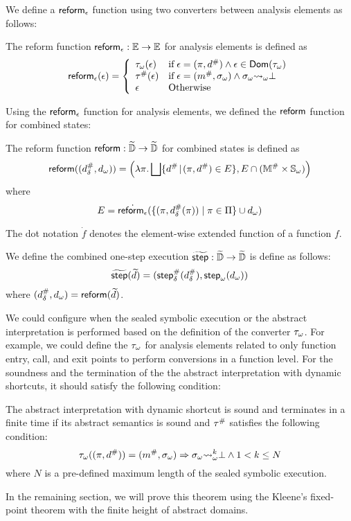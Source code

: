 We define a $\areform$ function using two converters between analysis elements
as follows:
\begin{definition}[$\areform$]\label{def:areform}
  The reform function $\textsf{reform}_\epsilon: \mathbb{E} \rightarrow \mathbb{E}$ for analysis
  elements is defined as
  \[
    \textsf{reform}_\epsilon(\epsilon) = \left\{
      \begin{array}{ll}
        {\tau}_\omega(\epsilon)
        & \text{if} \; \epsilon = (\pi, {d}^{\#}) \wedge \epsilon \in
        \textsf{Dom}({\tau}_\omega)\\
        {\tau}^{\#}(\epsilon)
        & \text{if} \; \epsilon = ({m}^{\#}, {\sigma}_\omega) \wedge {\sigma}_\omega {\leadsto}_\omega
        \bot\\
        \epsilon
        & \text{Otherwise}
      \end{array}
    \right.
  \]
\end{definition}
Using the $\areform$ function for analysis elements, we defined the $\reform$
function for combined states:
\begin{definition}[$\reform$]\label{def:reform}
  The reform function $\textsf{reform}: \widetilde{\mathbb{D}} \rightarrow \widetilde{\mathbb{D}}$ for combined
  states is defined as
  \[
    \textsf{reform}(({{d}^{\#}_\delta}, {{d}_\omega})) = \left(
      \lambda \pi. \bigsqcup \{ {d}^{\#} \!\mid\! (\pi, {d}^{\#}) \in E \},
      E \cap ({\mathbb{M}}^{\#} \times {\mathbb{S}}_\omega)
    \right)
  \]
  where
  \[
    E = \dot{\textsf{reform}_\epsilon}(\{ (\pi, {{d}^{\#}_\delta}(\pi)) \mid \pi \in \Pi \} \cup {{d}_\omega})
  \]
\end{definition}
The dot notation $\dot{f}$ denotes the element-wise extended function of a
function $f$.

\begin{definition}
  We define the combined one-step execution $\widetilde{\textsf{step}}: \widetilde{\mathbb{D}} \rightarrow
  \widetilde{\mathbb{D}}$ is define as follows:
  \[
    \widetilde{\textsf{step}}(\widetilde{d}) = (
      {\textsf{step}}^{\#}_\delta({{d}^{\#}_\delta}),
      {\textsf{step}}_\omega({{d}_\omega})
    )
  \]
  where $({{d}^{\#}_\delta}, {{d}_\omega}) = \textsf{reform}(\widetilde{d})$.
\end{definition}

We could configure when the sealed symbolic execution or the abstract
interpretation is performed based on the definition of the converter
${\tau}_\omega$.  For example, we could define the ${\tau}_\omega$ for analysis
elements related to only function entry, call, and exit points to perform
conversions in a function level.  For the soundness and the termination of the
the abstract interpretation with dynamic shortcuts, it should satisfy the
following condition:
\begin{theorem}\label{theorem:shortcut}
  The abstract interpretation with dynamic shortcut is sound and terminates in a
  finite time if its abstract semantics is sound and ${\tau}^{\#}$ satisfies the
  following condition:
  \begin{equation}\label{equ:cond}
    {\tau}_\omega((\pi, {d}^{\#})) = ({m}^{\#}, {\sigma}_\omega) \Rightarrow
    {\sigma}_\omega {\leadsto}_\omega^k \bot \wedge 1 < k \leq N
  \end{equation}
  where $N$ is a pre-defined maximum length of the sealed symbolic execution.
\end{theorem}

In the remaining section, we will prove this theorem using the Kleene's
fixed-point theorem with the finite height of abstract domains.
